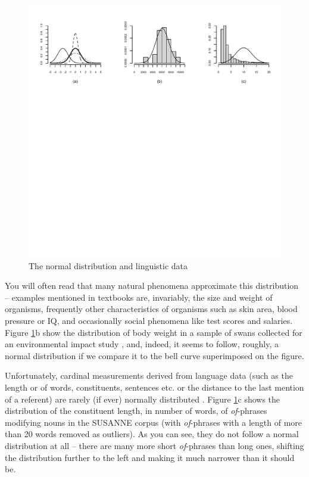 \begin{figure}[!htbp]
\caption{The normal distribution and linguistic data}
\label{fig:normdist}
\includegraphics[width=\textwidth,keepaspectratio]{figures/normdist}
\end{figure}

You will often read that many natural phenomena approximate this distribution -- examples mentioned in textbooks are, invariably, the size and weight of organisms, frequently other characteristics of organisms such as skin area, blood pressure or IQ, and occasionally social phenomena like test scores and salaries. Figure \ref{fig:normdist}b show the distribution of body weight in a sample of swans collected for an environmental impact study \citep{fite_residues_1979}, and, indeed, it seems to follow, roughly, a normal distribution if we compare it to the bell curve superimposed on the figure.

Unfortunately, cardinal measurements derived from language data (such as the length or of words, constituents, sentences etc. or the distance to the last mention of a referent) are rarely (if ever) normally distributed \citep[see, e.g.,][51]{mcenery_corpus_2012}. Figure \ref{fig:normdist}c shows the distribution of the constituent length, in number of words, of \textit{of}-phrases modifying nouns in the SUSANNE corpus (with \textit{of}-phrases with a length of more than 20 words removed as outliers). As you can see, they do not follow a normal distribution at all -- there are many more short \textit{of}-phrases than long ones, shifting the distribution further to the left and making it much narrower than it should be.

